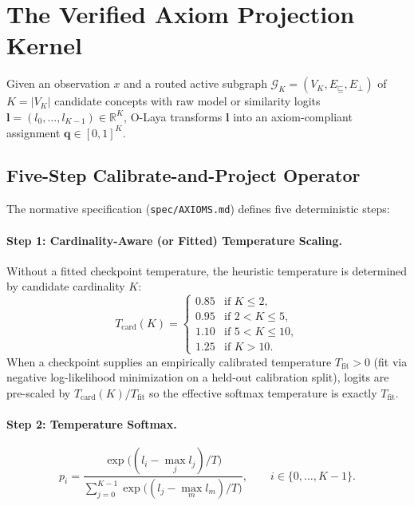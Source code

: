 \documentclass[11pt,a4paper]{article}
\begin{document}
\section{The Verified Axiom Projection Kernel}
\label{sec:kernel}

Given an observation $x$ and a routed active subgraph $\mathcal{G}_K = (V_K, E_{\sqsubseteq}, E_{\perp})$ of $K = |V_K|$ candidate concepts with raw model or similarity logits $\mathbf{l} = (l_0, \dots, l_{K-1}) \in \mathbb{R}^K$, O-Laya transforms $\mathbf{l}$ into an axiom-compliant assignment $\mathbf{q} \in [0, 1]^K$.

\subsection{Five-Step Calibrate-and-Project Operator}

The normative specification (\texttt{spec/AXIOMS.md}) defines five deterministic steps:

\paragraph{Step 1: Cardinality-Aware (or Fitted) Temperature Scaling.}
Without a fitted checkpoint temperature, the heuristic temperature is determined by candidate cardinality $K$:
\begin{equation}
  T_{\mathrm{card}}(K) = \begin{cases}
    0.85 & \text{if } K \le 2, \\
    0.95 & \text{if } 2 < K \le 5, \\
    1.10 & \text{if } 5 < K \le 10, \\
    1.25 & \text{if } K > 10.
  \end{cases}
\end{equation}
When a checkpoint supplies an empirically calibrated temperature $T_{\mathrm{fit}} > 0$ (fit via negative log-likelihood minimization on a held-out calibration split), logits are pre-scaled by $T_{\mathrm{card}}(K) / T_{\mathrm{fit}}$ so the effective softmax temperature is exactly $T_{\mathrm{fit}}$.

\paragraph{Step 2: Temperature Softmax.}
\begin{equation}
  p_i = \frac{\exp\bigl((l_i - \max_j l_j) / T\bigr)}{\sum_{j=0}^{K-1} \exp\bigl((l_j - \max_m l_m) / T\bigr)}, \qquad i \in \{0, \dots, K-1\}.
\end{equation}
\end{document}
